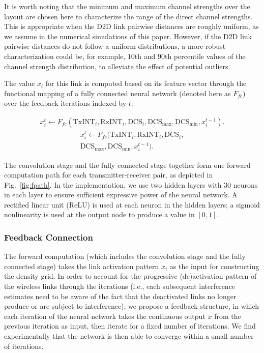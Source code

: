 \documentclass[journal,12pt,onecolumn,draftclsnofoot,]{IEEEtran}
\begin{document}
It is worth noting that the minimum and maximum channel strengths over the
layout are chosen here to characterize the range of the direct channel 
strengths. This is appropriate when the D2D link pairwise distances are roughly
uniform, as we assume in the numerical simulations of this paper. However, if
the D2D link pairwise distances do not follow a uniform distributions, a more
robust characterization could be, for example, $10${th} and $90${th} percentile
values of the channel strength distribution, to alleviate the effect of
potential outliers.  

The value $x_i$ for this link is computed based on its feature vector through
the functional mapping of a fully connected neural network (denoted here as $F_{fc}$)
over the feedback iterations indexed by $t$: 

\ifOneColumn
\begin{align}
    x_{i}^{t} \gets F_{fc}(\text{TxINT}_{i}, \text{RxINT}_{i}, \text{DCS}_{i}, \text{DCS}_{\max}, \text{DCS}_{\min}, x_{i}^{t-1}).
\end{align}
\else
\begin{multline}
    x_{i}^{t} \gets F_{fc}(\text{TxINT}_{i}, \text{RxINT}_{i}, \text{DCS}_{i}, \\
	\text{DCS}_{\max}, \text{DCS}_{\min}, x_{i}^{t-1}).
\end{multline}
\fi

The convolution stage and the fully connected stage together form one forward
computation path for each transmitter-receiver pair, as depicted 
in Fig.~\ref{fig:fpath}. In the implementation, we use two hidden layers with 30 neurons in each layer to ensure
sufficient expressive power of the neural network. A rectified linear unit
(ReLU) is used at each neuron in the hidden layers; a sigmoid nonlinearity is
used at the output node to produce a value in $[0,1]$.


\subsubsection{Feedback Connection}\label{sec:feedbacksection}

The forward computation (which includes the convolution stage and the fully
connected stage) takes the link activation pattern $x_i$ as the input for
constructing the density grid. In order to account for the progressive
(de)activation pattern of the wireless links through the iterations (i.e., each
subsequent interference estimates need to be aware of the fact that the
deactivated links no longer produce or are subject to interference), we
propose a feedback structure, in which each iteration of the neural network
takes the continuous output $x$ from the previous iteration as input, then
iterate for a fixed number of iterations. We find experimentally that the
network is then able to converge within a small number of iterations. 
\end{document}
